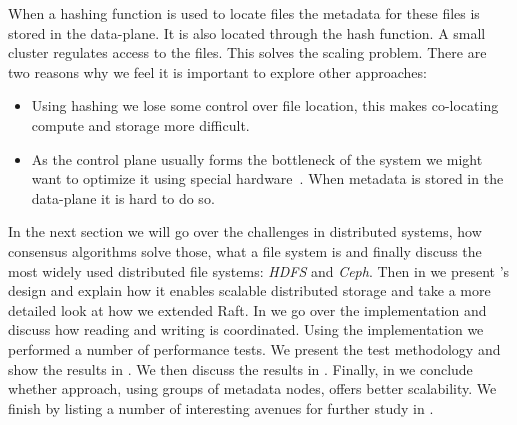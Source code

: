 When a hashing function is used to locate files the metadata for these files is stored in the data-plane. It is also located through the hash function. A small cluster regulates access to the files. This solves the scaling problem. There are two reasons why we feel it is important to explore other approaches:
\begin{itemize}
	\item Using hashing we lose some control over file location, this makes co-locating compute and storage more difficult.
	\item As the control plane usually forms the bottleneck of the system we might want to optimize it using special hardware~\cite{polarfs}. When metadata is stored in the data-plane it is hard to do so.
\end{itemize}

In the next section we will go over the challenges in distributed systems, how consensus algorithms solve those, what a file system is and finally discuss the most widely used distributed file systems: \textit{HDFS} and \textit{Ceph}. 
%
Then in  we present \name{}'s design and explain how it enables scalable distributed storage and take a more detailed look at how we extended Raft.
%
In  we go over the implementation and discuss how reading and writing is coordinated.
%
Using the \name{} implementation we performed a number of performance tests. We present the test methodology and show the results in .
% 
We then discuss the results in .
%
Finally, in  we conclude whether \name{} approach, using groups of metadata nodes, offers better scalability. 
%
We finish by listing a number of interesting avenues for further study in .
